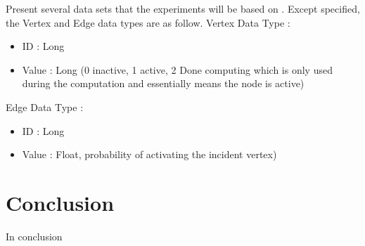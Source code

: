\documentclass[english]{tktltiki}
\begin{document}
Present several data sets that the experiments will be based on .
Except specified, the Vertex and Edge data types are as follow.
Vertex Data Type  :
\begin{itemize}
\item ID : Long
\item Value : Long (0 inactive, 1 active, 2 Done computing which is only used during the computation and essentially means the node is active)
\end{itemize}
Edge Data Type : 
\begin{itemize}
\item ID : Long
\item Value : Float, probability of activating the incident vertex)
\end{itemize}



\section{Conclusion}
In conclusion
\pagebreak





\lastpage
\appendices
\pagestyle{empty}
\end{document}
